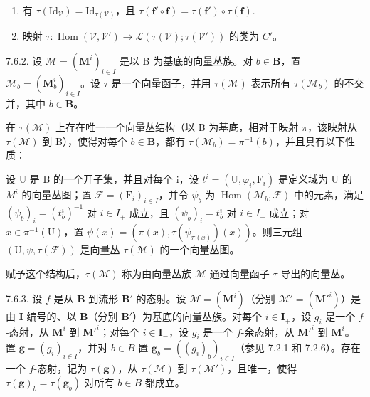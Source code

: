 \begin{enumerate}
\def\labelenumi{(\alph{enumi})}
\item
  有 \(\tau (\mathrm{Id}_{\mathcal{V}}) = \mathrm{Id}_{\tau (\mathcal{V})}\)，且 \(\tau (\mathbf{f}'\circ \mathbf{f}) = \tau (\mathbf{f}')\circ \tau (\mathbf{f}).\)
\item
  映射 \(\tau : \operatorname{Hom}(\mathcal{V}, \mathcal{V}') \to \mathcal{L}(\tau(\mathcal{V}); \tau(\mathcal{V}'))\) 的类为 \(C'\)。
\end{enumerate}

7.6.2. 设 \(\mathcal{M} = (\mathbf{M}^i)_{i\in I}\) 是以 B 为基底的向量丛族。对 \(b\in \mathbf{B}\)，置 \(\mathcal{M}_b = (\mathbf{M}_b^i)_{i\in I}\)。设 \(\tau\) 是一个向量函子，并用 \(\tau (\mathcal{M})\) 表示所有 \(\tau(\mathcal{M}_{b})\) 的不交并，其中 \(b\in\mathbf{B}\)。

在 \(\tau(\mathcal{M})\) 上存在唯一一个向量丛结构（以 B 为基底，相对于映射 \(\pi\)，该映射从 \(\tau(\mathcal{M})\) 到 B），使得对每个 \(b\in\mathbf{B}\)，都有 \(\tau(\mathcal{M}_{b})=\pi^{-1}(b)\)，并且具有以下性质：

设 U 是 B 的一个开子集，并且对每个 i，设 \(t^{i} = (\mathrm{U}, \varphi_{i}, \mathrm{F}_{i})\) 是定义域为 U 的 \(M^{i}\) 的向量丛图；置 \(\mathcal{F} = (\mathrm{F}_{i})_{i \in I}\)，并令 \(\psi_{b}\) 为 \(\operatorname{Hom}(\mathcal{M}_{b}, \mathcal{F})\) 中的元素，满足 \((\psi_{b})_{i} = (t_{b}^{i})^{-1}\) 对 \(i \in I_{+}\) 成立，且 \((\psi_{b})_{i} = t_{b}^{i}\) 对 \(i \in I_{-}\) 成立；对 \(x \in \pi^{-1}(\mathrm{U})\)，置 \(\psi(x) = (\pi(x), \tau(\psi_{\pi(x)})(x))\)。则三元组 \((\mathrm{U}, \psi, \tau(\mathcal{F}))\) 是向量丛 \(\tau(\mathcal{M})\) 的一个向量丛图。

赋予这个结构后，\(\tau(\mathcal{M})\) 称为由向量丛族 \(\mathcal{M}\) 通过向量函子 \(\tau\) 导出的向量丛。

7.6.3. 设 \(f\) 是从 \(\mathbf{B}\) 到流形 \(\mathbf{B}'\) 的态射。设 \(\mathcal{M} = (\mathbf{M}^i)\)（分别 \(\mathcal{M}' = (\mathbf{M}'^i)\)）是由 \(\mathbf{I}\) 编号的、以 \(\mathbf{B}\)（分别 \(\mathbf{B}'\)）为基底的向量丛族。对每个 \(i \in \mathbf{I}_+\)，设 \(g_i\) 是一个 \(f\)-态射，从 \(\mathbf{M}^i\) 到 \(\mathbf{M}'^i\)；对每个 \(i \in \mathbf{I}_-\)，设 \(g_i\) 是一个 \(f\)-余态射，从 \(\mathbf{M}'^i\) 到 \(\mathbf{M}^i\)。置 \(\mathbf{g} = (g_i)_{i \in I}\)，并对 \(b \in B\) 置 \(\mathbf{g}_b = ((g_i)_b)_{i \in I}\)（参见 7.2.1 和 7.2.6）。存在一个 \(f\)-态射，记为 \(\tau(\mathbf{g})\)，从 \(\tau(\mathcal{M})\) 到 \(\tau(\mathcal{M}')\)，且唯一，使得 \(\tau(\mathbf{g})_b = \tau(\mathbf{g}_b)\) 对所有 \(b \in B\) 都成立。


